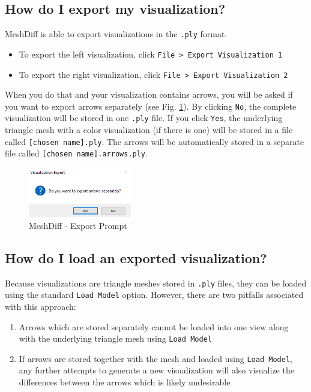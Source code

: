 \subsection{How do I export my visualization?}

MeshDiff is able to export visualizations in the \verb+.ply+ format.

\begin{itemize}
\item To export the left visualization, click \verb+File > Export Visualization 1+
\item To export the right visualization, click \verb+File > Export Visualization 2+
\end{itemize}

When you do that and your visualization contains arrows, you will be asked if you want to export arrows separately (see Fig. \ref{fig:meshdiff_separate_arrows}). By clicking \verb+No+, the complete visualization will be stored in one \verb+.ply+ file. If you click \verb+Yes+, the underlying triangle mesh with a color visualization (if there is one) will be stored in a file called \verb+[chosen name].ply+. The arrows will be automatically stored in a separate file called \verb+[chosen name].arrows.ply+.

\begin{figure}[h]
\centering
\includegraphics[width=0.4\textwidth]{./img/meshdiff-separate_arrows.PNG}
\caption[MeshDiff - Export Prompt]{MeshDiff - Export Prompt}
\label{fig:meshdiff_separate_arrows}
\end{figure}

\subsection{How do I load an exported visualization?}

Because visualizations are triangle meshes stored in \verb+.ply+ files, they can be loaded using the standard \verb+Load Model+ option. However, there are two pitfalls associated with this approach:

\begin{enumerate}
\item Arrows which are stored separately cannot be loaded into one view along with the underlying triangle mesh using \verb+Load Model+
\item If arrows are stored together with the mesh and loaded using \verb+Load Model+, any further attempts to generate a new visualization will also visualize the differences between the arrows which is likely undesirable
\end{enumerate}


